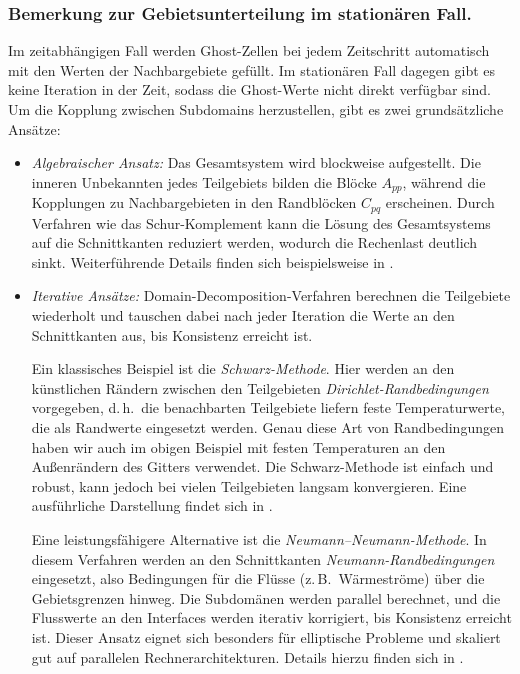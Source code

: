 \subsubsection*{Bemerkung zur Gebietsunterteilung im stationären Fall.}  
Im zeitabhängigen Fall werden Ghost-Zellen bei jedem Zeitschritt automatisch mit den Werten der Nachbargebiete gefüllt.  
Im stationären Fall dagegen gibt es keine Iteration in der Zeit, sodass die Ghost-Werte nicht direkt verfügbar sind.  
Um die Kopplung zwischen Subdomains herzustellen, gibt es zwei grundsätzliche Ansätze:

\begin{itemize}
	\item \emph{Algebraischer Ansatz:}  
	Das Gesamtsystem wird blockweise aufgestellt.  
	Die inneren Unbekannten jedes Teilgebiets bilden die Blöcke \(A_{pp}\), während die Kopplungen zu Nachbargebieten in den Randblöcken \(C_{pq}\) erscheinen.  
	Durch Verfahren wie das Schur-Komplement kann die Lösung des Gesamtsystems auf die Schnittkanten reduziert werden, wodurch die Rechenlast deutlich sinkt.  
	Weiterführende Details finden sich beispielsweise in \cite{parallelisierung:smith1996}.
	
	\item \emph{Iterative Ansätze:}  
	Domain-Decomposition-Verfahren berechnen die Teilgebiete wiederholt und tauschen dabei nach jeder Iteration die Werte an den Schnittkanten aus, bis Konsistenz erreicht ist.  
	
	Ein klassisches Beispiel ist die \emph{Schwarz-Methode}.  
	Hier werden an den künstlichen Rändern zwischen den Teilgebieten \emph{Dirichlet-Randbedingungen} vorgegeben, d.\,h.\ die benachbarten Teilgebiete liefern feste Temperaturwerte, die als Randwerte eingesetzt werden.  
	Genau diese Art von Randbedingungen haben wir auch im obigen Beispiel mit festen Temperaturen an den Außenrändern des Gitters verwendet.  
	Die Schwarz-Methode ist einfach und robust, kann jedoch bei vielen Teilgebieten langsam konvergieren.  
	Eine ausführliche Darstellung findet sich in \cite{parallelisierung:quarteroniValli1999}.  
	
	Eine leistungsfähigere Alternative ist die \emph{Neumann--Neumann-Methode}.  
	In diesem Verfahren werden an den Schnittkanten \emph{Neumann-Randbedingungen} eingesetzt, also Bedingungen für die Flüsse (z.\,B.\ Wärmeströme) über die Gebietsgrenzen hinweg.  
	Die Subdomänen werden parallel berechnet, und die Flusswerte an den Interfaces werden iterativ korrigiert, bis Konsistenz erreicht ist.  
	Dieser Ansatz eignet sich besonders für elliptische Probleme und skaliert gut auf parallelen Rechnerarchitekturen.  
	Details hierzu finden sich in \cite{parallelisierung:Gander}.
\end{itemize}


